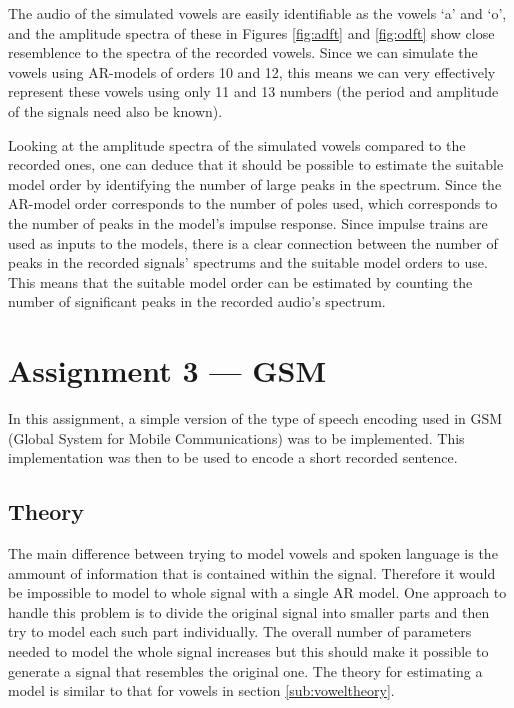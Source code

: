 \documentclass{IEEEtran}
\begin{document}
The audio of the simulated vowels are easily identifiable as the vowels
`a' and `o', and the amplitude spectra of these in Figures \ref{fig:adft} and
\ref{fig:odft} show close resemblence to the spectra of the recorded vowels.
Since we can simulate the vowels using AR-models of orders 10 and 12, this
means we can very effectively represent these vowels using only 11 and 13
numbers (the period and amplitude of the signals need also be known).

Looking at the amplitude spectra of the simulated vowels compared to the
recorded ones, one can deduce that it should be possible to estimate the
suitable model order by identifying the number of large peaks in the
spectrum. Since the AR-model order corresponds to the number of poles used,
which corresponds to the number of peaks in the model's impulse response. Since
impulse trains are used as inputs to the models, there is a clear connection
between the number of peaks in the recorded signals' spectrums and the
suitable model orders to use. This means that the suitable model order
can be estimated by counting the number of significant peaks in the
recorded audio's spectrum.

\section{Assignment 3 --- GSM}

In this assignment, a simple version of the type of speech encoding used in GSM
(Global System for Mobile Communications) was to be implemented. This
implementation was then to be used to encode a short recorded sentence.

\subsection{Theory}
\label{sub:vimtheory}

The main difference between trying to model vowels and spoken language
is the ammount of information that is contained within the signal.
Therefore it would be impossible to model to whole signal with a
single AR model. One approach to handle this problem is to divide
the original signal into smaller parts and then try to model each such
part individually. The overall number of parameters needed to model the
whole signal increases but this should make it possible to generate a
signal that resembles the original one. The theory for estimating a
model is similar to that for vowels in section \ref{sub:voweltheory}.
\end{document}
